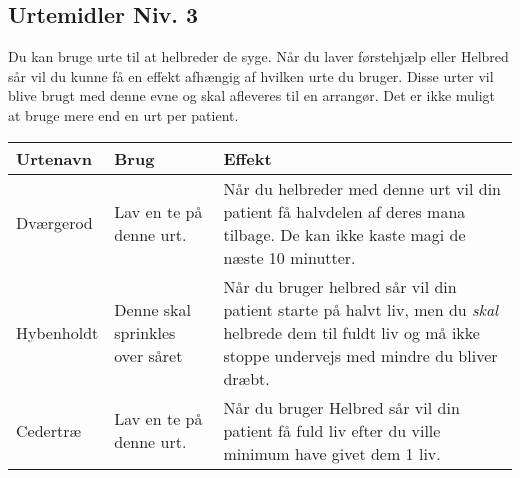 \subsection*{Urtemidler Niv. 3}

Du kan bruge urte til at helbreder de syge. Når du laver førstehjælp eller Helbred sår vil du kunne få en effekt afhængig af hvilken urte du bruger. Disse urter vil blive brugt med denne evne og skal afleveres til en arrangør. Det er ikke muligt at bruge mere end en urt per patient.
\begin{table}[H]
     \centering
    \begin{tabular}{|p{}|p{}|p{}|}
    \rowcolor{cerulean!80}\hline
        Urtenavn & Brug & Effekt \\\hline
        Dværgerod & Lav en te på denne urt. & Når du helbreder med denne urt vil din patient få halvdelen af deres mana tilbage. De kan ikke kaste magi de næste 10 minutter.\\\hline
        Hybenholdt &Denne skal sprinkles over såret& Når du bruger helbred sår vil din patient starte på halvt liv, men du \emph{skal} helbrede dem til fuldt liv og må ikke stoppe undervejs med mindre du bliver dræbt.\\\hline
        Cedertræ &Lav en te på denne urt.& Når du bruger Helbred sår vil din patient få fuld liv efter du ville minimum have givet dem 1 liv.\\\hline
    \end{tabular}
\end{table}

 